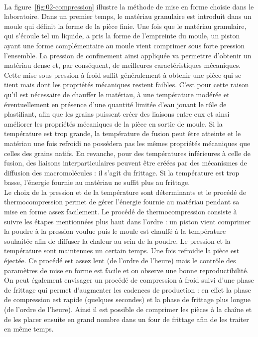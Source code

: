 \\La figure~\ref{fig:02-compression} illustre la méthode de mise en forme choisie dans le laboratoire. Dans un premier temps, le matériau granulaire est introduit dans un moule qui définit la forme de la pièce finie. Une fois que le matériau granulaire, qui s'écoule tel un liquide, a pris la forme de l'empreinte du moule, un piston ayant une forme complémentaire au moule vient comprimer sous forte pression l'ensemble. La pression de confinement ainsi appliquée va permettre d'obtenir un matériau dense et, par conséquent, de meilleures caractéristiques mécaniques. Cette mise sous pression à froid suffit généralement à obtenir une pièce qui se tient mais dont les propriétés mécaniques restent faibles. C'est pour cette raison qu'il est nécessaire de chauffer le matériau, à une température modérée et éventuellement en présence d'une quantité limitée d'eau jouant le rôle de plastifiant, afin que les grains puissent créer des liaisons entre eux et ainsi améliorer les propriétés mécaniques de la pièce en sortie de moule. Si la température est trop grande, la température de fusion peut être atteinte et le matériau une fois refroidi ne possédera pas les mêmes propriétés mécaniques que celles des grains natifs. En revanche, pour des températures inférieures à celle de fusion, des liaisons interparticulaires peuvent être créées par des mécanismes de diffusion des macromolécules : il s'agit du frittage. Si la température est trop basse, l'énergie fournie au matériau ne suffit plus au frittage.
\\Le choix de la pression et de la température sont déterminants et le procédé de thermocompression permet de gérer l'énergie fournie au matériau pendant sa mise en forme assez facilement. Le procédé de thermocompression consiste à suivre les étapes mentionnées plus haut dans l'ordre : un piston vient comprimer la poudre à la pression voulue puis le moule est chauffé à la température souhaitée afin de diffuser la chaleur au sein de la poudre. Le pression et la température sont maintenues un certain temps. Une fois refroidie la pièce est éjectée. Ce procédé est assez lent (de l'ordre de l'heure) mais le contrôle des paramètres de mise en forme est facile et on observe une bonne reproductibilité. On peut également envisager un procédé de compression à froid suivi d'une phase de frittage qui permet d'augmenter les cadences de production : en effet la phase de compression est rapide (quelques secondes) et la phase de frittage plus longue (de l'ordre de l'heure). Ainsi il est possible de comprimer les pièces à la chaîne et de les placer ensuite en grand nombre dans un four de frittage afin de les traiter en même temps.

